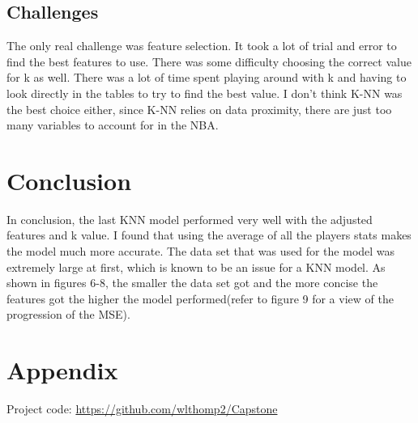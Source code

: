 \documentclass[11pt]{article}
\begin{document}
\subsection{Challenges}

    The only real challenge was feature selection. It took a lot of trial
and error to find the best features to use. There was some difficulty
choosing the correct value for k as well. There was a lot of time spent
playing around with k and having to look directly in the tables to try
to find the best value. I don't think K-NN was the best choice either,
since K-NN relies on data proximity, there are just too many variables to
account for in the NBA.

\section{Conclusion}


In conclusion, the last KNN model performed very well with the adjusted features and k value. I found that using the average of all the players stats makes the model
much more accurate. The data set that was used for the model was extremely large at first, which is known to be an issue for a KNN model. As shown in figures 6-8, the smaller the data set got and the more concise the features got the higher the model performed(refer to figure 9 for a view of the progression of the MSE).  








\section{Appendix}

Project code: \href{https://github.com/wlthomp2/Capstone}{https://github.com/wlthomp2/Capstone}
\end{document}
